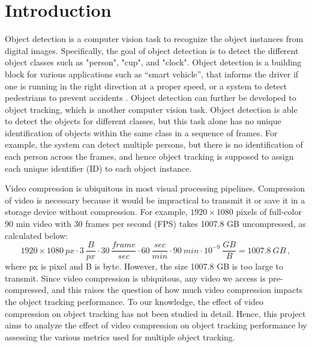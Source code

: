 \chapter{Introduction}
\label{chap:introduction}

Object detection is a computer vision task to recognize the object instances from digital images. Specifically, the goal of object detection is to detect the different object classes such as "person", "cup", and "clock". Object detection is a building block for various applications such as “smart vehicle”, that informs the driver if one is running in the right direction at a proper speed, or a system to detect pedestrians to prevent accidents \cite{gavrila_real-time_1999}. Object detection can further be developed to object tracking, which is another computer vision task. Object detection is able to detect the objects for different classes, but this task alone has no unique identification of objects within the same class in a sequence of frames. For example, the system can detect multiple persons, but there is no identification of each person across the frames, and hence object tracking is supposed to assign each unique identifier (ID) to each object instance.

Video compression is ubiquitous in most visual processing pipelines. Compression of video is necessary because it would be impractical to transmit it or save it in a storage device without compression. For example, $1920\times1080$ pixels of full-color 90 min video with 30 frames per second (FPS) takes 1007.8 GB uncompressed, as calculated below:
\begin{equation}
    1920 \times 1080~px \cdot 3~\frac{B}{px} \cdot 30~\frac{frame}{sec} \cdot 60~\frac{sec}{min} \cdot 90~min \cdot 10^{-9}~\frac{GB}{B}  = 1007.8~GB~,
\end{equation}
where px is pixel and B is byte. However, the size 1007.8 GB is too large to transmit. Since video compression is ubiquitous, any video we access is pre-compressed, and this raises the question of how much video compression impacts the object tracking performance. To our knowledge, the effect of video compression on object tracking has not been studied in detail. Hence, this project aims to analyze the effect of video compression on object tracking performance by assessing the various metrics used for multiple object tracking.







